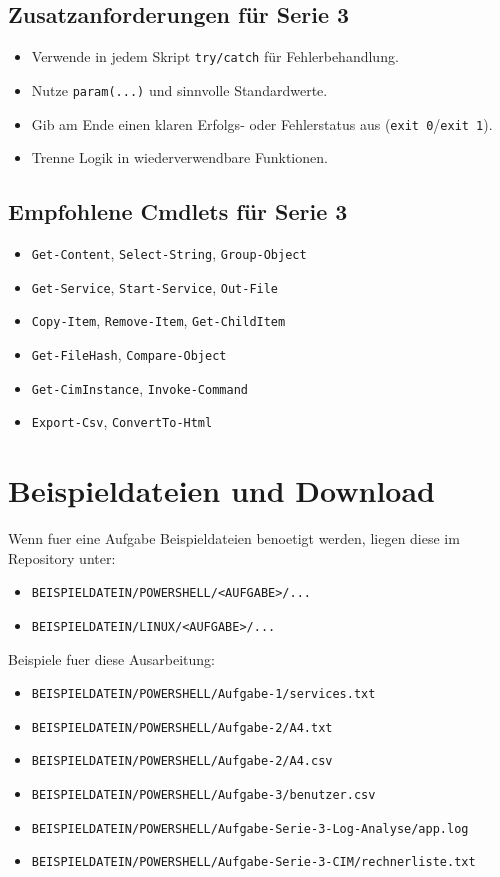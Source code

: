 \documentclass[11pt, oneside, numbers=noenddot]{scrbook}
\begin{document}
\section{Zusatzanforderungen für Serie 3}
\begin{itemize}
\item Verwende in jedem Skript \texttt{try/catch} für Fehlerbehandlung.
\item Nutze \texttt{param(...)} und sinnvolle Standardwerte.
\item Gib am Ende einen klaren Erfolgs- oder Fehlerstatus aus (\texttt{exit 0}/\texttt{exit 1}).
\item Trenne Logik in wiederverwendbare Funktionen.
\end{itemize}

\section{Empfohlene Cmdlets für Serie 3}
\begin{itemize}
\item \texttt{Get-Content}, \texttt{Select-String}, \texttt{Group-Object}
\item \texttt{Get-Service}, \texttt{Start-Service}, \texttt{Out-File}
\item \texttt{Copy-Item}, \texttt{Remove-Item}, \texttt{Get-ChildItem}
\item \texttt{Get-FileHash}, \texttt{Compare-Object}
\item \texttt{Get-CimInstance}, \texttt{Invoke-Command}
\item \texttt{Export-Csv}, \texttt{ConvertTo-Html}
\end{itemize}

\chapter{Beispieldateien und Download}
Wenn fuer eine Aufgabe Beispieldateien benoetigt werden, liegen diese im Repository unter:
\begin{itemize}
\item \texttt{BEISPIELDATEIN/POWERSHELL/<AUFGABE>/...}
\item \texttt{BEISPIELDATEIN/LINUX/<AUFGABE>/...}
\end{itemize}

Beispiele fuer diese Ausarbeitung:
\begin{itemize}
\item \texttt{BEISPIELDATEIN/POWERSHELL/Aufgabe-1/services.txt}
\item \texttt{BEISPIELDATEIN/POWERSHELL/Aufgabe-2/A4.txt}
\item \texttt{BEISPIELDATEIN/POWERSHELL/Aufgabe-2/A4.csv}
\item \texttt{BEISPIELDATEIN/POWERSHELL/Aufgabe-3/benutzer.csv}
\item \texttt{BEISPIELDATEIN/POWERSHELL/Aufgabe-Serie-3-Log-Analyse/app.log}
\item \texttt{BEISPIELDATEIN/POWERSHELL/Aufgabe-Serie-3-CIM/rechnerliste.txt}
\end{itemize}
\end{document}
